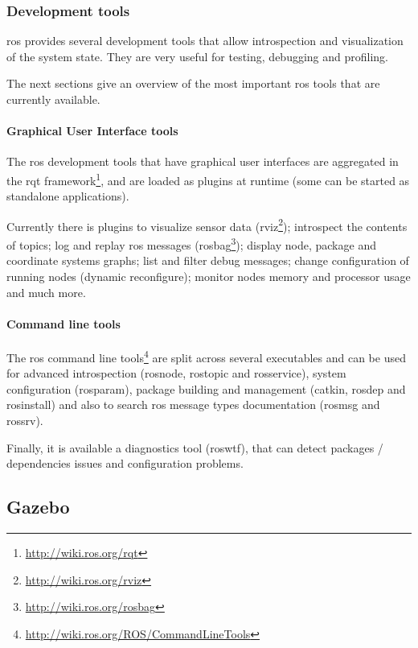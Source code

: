 \subsubsection{Development tools}

\gls{ros} provides several development tools that allow introspection and visualization of the system state. They are very useful for testing, debugging and profiling.

The next sections give an overview of the most important \gls{ros} tools that are currently available.


\paragraph{Graphical User Interface tools}

The \gls{ros} development tools that have graphical user interfaces are aggregated in the rqt framework\footnote{\url{http://wiki.ros.org/rqt}}, and are loaded as plugins at runtime (some can be started as standalone applications).

Currently there is plugins to visualize sensor data (rviz\footnote{\url{http://wiki.ros.org/rviz}}); introspect the contents of topics; log and replay \gls{ros} messages (rosbag\footnote{\url{http://wiki.ros.org/rosbag}}); display node, package and coordinate systems graphs; list and filter debug messages; change configuration of running nodes (dynamic reconfigure); monitor nodes memory and processor usage and much more.


\paragraph{Command line tools}

The \gls{ros} command line tools\footnote{\url{http://wiki.ros.org/ROS/CommandLineTools}} are split across several executables and can be used for advanced introspection (rosnode, rostopic and rosservice), system configuration (rosparam), package building and management (catkin, rosdep and rosinstall) and also to search \gls{ros} message types documentation (rosmsg and rossrv).

Finally, it is available a diagnostics tool (roswtf), that can detect packages / dependencies issues and configuration problems.


\subsection{Gazebo}

